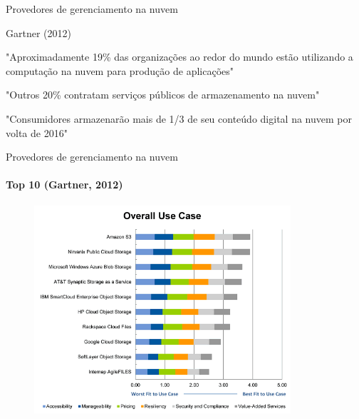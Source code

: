 \begin{frame}{Provedores de gerenciamento na nuvem}

    \begin{block}{Gartner (2012)}
        \begin{itemise}
        \item<2-> "Aproximadamente 19\% das organizações ao redor do mundo estão utilizando
        a computação na nuvem para produção de aplicações"
        
        \item<3->
            "Outros 20\% contratam serviços públicos de armazenamento na nuvem"
        
        \item<4->
            "Consumidores armazenarão mais de 1/3 de seu conteúdo digital na nuvem
            por volta de 2016"
        \end{itemise}
    \end{block}

        
\end{frame}

\begin{frame}{Provedores de gerenciamento na nuvem}
    \framesubtitle{Top 10 (Gartner, 2012)}

    \begin{figure}
        \includegraphics[width=0.85\textwidth]{image/top10.png}
    \end{figure}

\end{frame}
